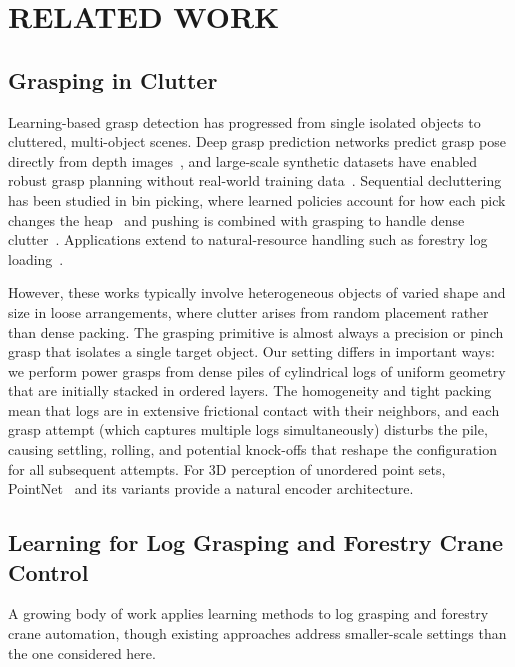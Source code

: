 \documentclass[letterpaper, 10 pt, conference]{ieeeconf}
\begin{document}
\section{RELATED WORK}

\subsection{Grasping in Clutter}
Learning-based grasp detection has progressed from single isolated objects to cluttered, multi-object scenes.                                       
Deep grasp prediction networks predict grasp pose directly from depth images~\cite{morrison2018closing, kumra2017robotic}, and large-scale
synthetic datasets have enabled robust grasp planning without real-world
training data~\cite{mahler2017dexnet}.
Sequential decluttering has been studied in bin picking, where learned
policies account for how each pick changes the
heap~\cite{mahler2017sequential} and pushing is combined with grasping to
handle dense clutter~\cite{zeng2018learning}.
Applications extend to natural-resource handling such as forestry log loading~\cite{wallin2024multilog}.

However, these works typically involve heterogeneous objects of varied shape and size in loose arrangements, where clutter arises from random placement rather than dense packing.
The grasping primitive is almost always a precision or pinch grasp that isolates a single target object.
Our setting differs in important ways: we perform power grasps from dense piles of cylindrical logs of uniform geometry that are initially stacked in ordered layers.
The homogeneity and tight packing mean that logs are in extensive frictional contact with their neighbors, and each grasp attempt (which captures multiple logs simultaneously) disturbs the pile, causing settling, rolling, and potential knock-offs that reshape the configuration for all subsequent attempts.
For 3D perception of unordered point sets, PointNet~\cite{qi2017pointnet} and its variants provide a natural encoder architecture.

\subsection{Learning for Log Grasping and Forestry Crane Control}
A growing body of work applies learning methods to log grasping and forestry crane automation, though existing approaches address smaller-scale settings than the one considered here.
\end{document}

